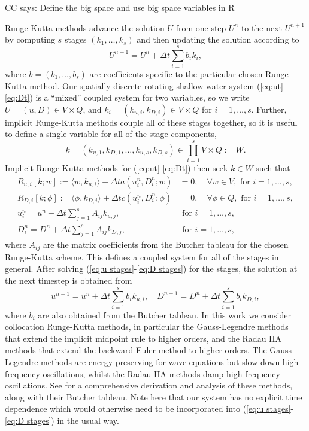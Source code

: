 \documentclass[a4paper, 12pt]{article}
\newcommand{\colin}[1]{{\color{blue}CC says: #1}}
\begin{document}
\colin{Define the big space and use big space variables in R}

Runge-Kutta methods advance the solution $U$ from one step $U^n$ to
the next $U^{n+1}$ by computing $s$ stages $(k_1,\ldots,k_s)$ and then
updating the solution according to
\begin{equation}
  U^{n+1} = U^n + \Delta t\sum_{i=1}^s b_i k_i,
\end{equation}
where $b=(b_1,\ldots, b_s)$ are coefficients specific to the
particular chosen Runge-Kutta method. Our spatially discrete rotating
shallow water system (\ref{eq:ut}-\ref{eq:Dt}) is a ``mixed'' coupled
system for two variables, so we write $U=(u,D)\in V\times Q$, and $k_i
= (k_{u,i},k_{D,i})\in V\times Q$ for $i=1,\ldots,s$. Further,
implicit Runge-Kutta methods couple all of these stages together, so it
is useful to define a single variable for all of the stage components,
\[
k = (k_{u,1},k_{D,1},\ldots,k_{u,s},k_{D,s}) \in
\prod_{i=1}^s V\times Q := W.
\]
Implicit Runge-Kutta methods for (\ref{eq:ut}-\ref{eq:Dt}) then 
seek $k\in W$ such that
\begin{align}
    \label{eq:u stages}
    R_{u,i}[k;w] := \langle w, k_{u,i} \rangle + \Delta t a\left(
    u^n_i,D^n_i;w\right)
  & = 0,  
  \quad \forall w \in V,\mbox{ for }i=1,\ldots,s, \\
  \label{eq:D stages}
  R_{D,i}[k;\phi] := \langle \phi, k_{D,i} \rangle + \Delta tc\left(u^n_i,D^n_i; \phi\right)
  & = 0, \quad \forall \phi \in Q, \mbox{ for }i=1,\ldots,s,\\
  u^n_i = u^n + \Delta t\sum_{j=1}^sA_{ij}k_{u,j}, & \mbox{ for }i=1,\ldots,s,\\
  D^n_i = D^n + \Delta t\sum_{j=1}^sA_{ij}k_{D,j}, & \mbox{ for }i=1,\ldots,s,
\end{align}
where $A_{ij}$ are the matrix coefficients from the Butcher
tableau for the chosen Runge-Kutta scheme. This defines a coupled
system for all of the stages in general. After solving
(\ref{eq:u stages}-\ref{eq:D stages}) for the stages, the solution
at the next timestep is obtained from
\begin{equation}
  u^{n+1} = u^n + \Delta t\sum_{i=1}^sb_i k_{u,i},\quad
  D^{n+1} = D^n + \Delta t\sum_{i=1}^sb_i k_{D,i},
\end{equation}
where $b_i$ are also obtained from the Butcher tableau. In this work
we consider collocation Runge-Kutta methods, in particular the
Gauss-Legendre methods that extend the implicit midpoint rule to
higher orders, and the Radau IIA methods that extend the backward Euler
method to higher orders. The Gauss-Legendre methods are energy
preserving for wave equations but slow down high frequency
oscillations, whilst the Radau IIA methods damp high frequency
oscillations.  See \citet{wanner1996solving} for a comprehensive
derivation and analysis of these methods, along with their Butcher
tableau. Note here that our system has no explicit time dependence
which would otherwise need to be incorporated into (\ref{eq:u
  stages}-\ref{eq:D stages}) in the usual way.
\end{document}
